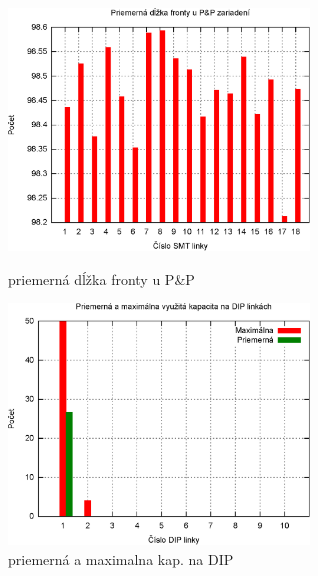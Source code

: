 \documentclass[12pt,a4paper,titlepage,final]{article}
\begin{document}
\begin{figure}[!ht]
  \centering
  \begin{minipage}{0.45\linewidth}
  \centering
  \includegraphics[width=8cm]{doc/1_hist3.eps}
  \caption{priemerná dĺžka fronty u P\&P}
  \end{minipage}
  \quad
  \begin{minipage}{0.45\linewidth}
    \centering
    \includegraphics[width=8cm]{doc/1_hist4.eps}
    \caption{priemerná a maximalna kap. na DIP}
  \end{minipage}
\end{figure}

\newpage
\end{document}
